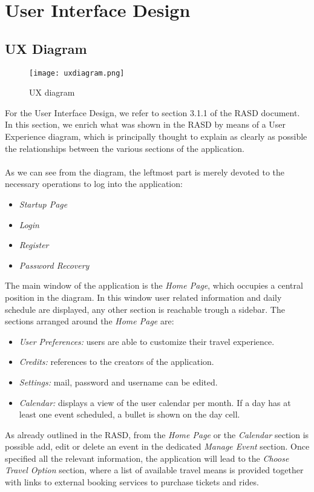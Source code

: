 \section{User Interface Design}

\subsection{UX Diagram}

\begin{figure}[H]
	\centering
	\texttt{[image: uxdiagram.png]}
	\caption{UX diagram}
\end{figure}

For the User Interface Design, we refer to section 3.1.1 of the RASD document. In this section, we enrich what was shown in the RASD by means of a User Experience diagram, which is principally thought to explain as clearly as possible the relationships between the various sections of the application.\\ \\
As we can see from the diagram, the leftmost part is merely devoted to the necessary operations to log into the application:

\begin{itemize}
	\item \textit{Startup Page}
	\item \textit{Login}
	\item \textit{Register}
	\item \textit{Password Recovery}
\end{itemize}

The main window of the application is the \textit{Home Page}, which occupies a central position in the diagram. In this window user related information and daily schedule are displayed, any other section is reachable trough a sidebar.
The sections arranged around the \textit{Home Page} are:

\begin{itemize}
	\item \textit{User Preferences:} users are able to customize their travel experience.
	\item \textit{Credits:} references to the creators of the application.
	\item \textit{Settings:} mail, password and username can be edited.
	\item \textit{Calendar:} displays a view of the user calendar per month. If a day has at least one event scheduled, a bullet is shown on the day cell.
\end{itemize}

As already outlined in the RASD, from the \textit{Home Page} or the \textit{Calendar} section is possible add, edit or delete an event in the dedicated \textit{Manage Event} section. Once specified all the relevant information, the application will lead to the \textit{Choose Travel Option} section, where a list of available travel means is provided together with links to external booking services to purchase tickets and rides.
